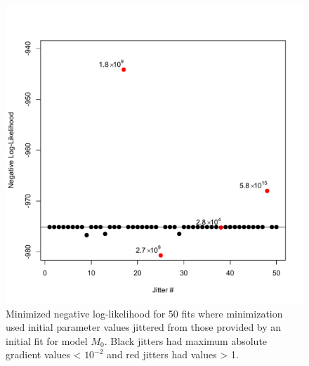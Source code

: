 \documentclass[
]{article}
\begin{document}
\begin{figure}

{\centering \includegraphics[width=1\linewidth]{fit_0_jitter_plt} 

}

\caption{Minimized negative log-likelihood for 50 fits where minimization used initial parameter values jittered from those provided by an initial fit for model $M_0$. Black jitters had maximum absolute gradient values < $10^{-2}$ and red jitters had values > 1.}\label{fig:jitter-M0}
\end{figure}
\pagebreak
\end{document}
